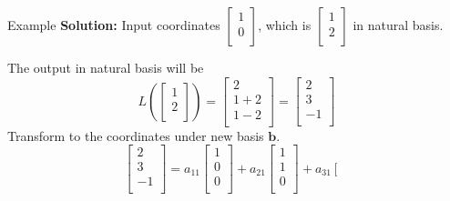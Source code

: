 \documentclass{beamer}
\begin{document}
\begin{frame}{Example}
\textbf{Solution:}\newline
Input coordinates $\left[ \begin{array}{c}
    1\\
    0\\
\end{array} \right]$, which is $\left[ \begin{array}{c}
    1\\
    2\\
\end{array} \right]$ in natural basis.

The output in natural basis will be
\begin{equation*}
    L\left( \left[ \begin{array}{c}
        1\\
        2\\
    \end{array} \right] \right) =\left[ \begin{array}{c}
        2\\
        1+2\\
        1-2\\
    \end{array} \right] =\left[ \begin{array}{c}
        2\\
        3\\
        -1\\
    \end{array} \right]
\end{equation*}
Transform to the coordinates under new basis $\mathbf{b}$.
\begin{equation*}
    \left[ \begin{array}{c}
        2\\
        3\\
        -1\\
    \end{array} \right] =a_{11}\left[ \begin{array}{c}
        1\\
        0\\
        0\\
    \end{array} \right] +a_{21}\left[ \begin{array}{c}
        1\\
        1\\
        0\\
    \end{array} \right] +a_{31}\left[ \begin{array}{c}

\end{array}
\end{equation*}
\end{frame}
\end{document}
